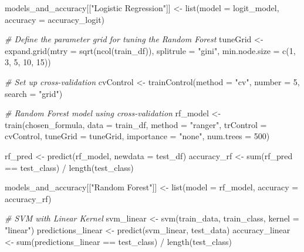 \documentclass[
]{article}
\newenvironment{Shaded}{\begin{snugshade}}{\end{snugshade}}
\newcommand{\AttributeTok}[1]{\textcolor[rgb]{0.77,0.63,0.00}{#1}}
\newcommand{\CommentTok}[1]{\textcolor[rgb]{0.56,0.35,0.01}{\textit{#1}}}
\newcommand{\DecValTok}[1]{\textcolor[rgb]{0.00,0.00,0.81}{#1}}
\newcommand{\FunctionTok}[1]{\textcolor[rgb]{0.00,0.00,0.00}{#1}}
\newcommand{\NormalTok}[1]{#1}
\newcommand{\OtherTok}[1]{\textcolor[rgb]{0.56,0.35,0.01}{#1}}
\newcommand{\SpecialCharTok}[1]{\textcolor[rgb]{0.00,0.00,0.00}{#1}}
\newcommand{\StringTok}[1]{\textcolor[rgb]{0.31,0.60,0.02}{#1}}
\begin{document}
\begin{Shaded}
\begin{Highlighting}[]
\NormalTok{  models\_and\_accuracy[[}\StringTok{"Logistic Regression"}\NormalTok{]] }\OtherTok{\textless{}{-}} \FunctionTok{list}\NormalTok{(}\AttributeTok{model =}\NormalTok{ logit\_model, }\AttributeTok{accuracy =}\NormalTok{ accuracy\_logit)}
  
  \CommentTok{\# Define the parameter grid for tuning the Random Forest}
\NormalTok{  tuneGrid }\OtherTok{\textless{}{-}} \FunctionTok{expand.grid}\NormalTok{(}\AttributeTok{mtry =} \FunctionTok{sqrt}\NormalTok{(}\FunctionTok{ncol}\NormalTok{(train\_df)),}
                        \AttributeTok{splitrule =} \StringTok{"gini"}\NormalTok{,}
                        \AttributeTok{min.node.size =} \FunctionTok{c}\NormalTok{(}\DecValTok{1}\NormalTok{, }\DecValTok{3}\NormalTok{, }\DecValTok{5}\NormalTok{, }\DecValTok{10}\NormalTok{, }\DecValTok{15}\NormalTok{))}

  \CommentTok{\# Set up cross{-}validation}
\NormalTok{  cvControl }\OtherTok{\textless{}{-}} \FunctionTok{trainControl}\NormalTok{(}\AttributeTok{method =} \StringTok{"cv"}\NormalTok{, }\AttributeTok{number =} \DecValTok{5}\NormalTok{, }\AttributeTok{search =} \StringTok{"grid"}\NormalTok{)}

  \CommentTok{\# Random Forest model using cross{-}validation}
\NormalTok{  rf\_model }\OtherTok{\textless{}{-}} \FunctionTok{train}\NormalTok{(chosen\_formula, }\AttributeTok{data =}\NormalTok{ train\_df,}
                  \AttributeTok{method =} \StringTok{"ranger"}\NormalTok{,}
                  \AttributeTok{trControl =}\NormalTok{ cvControl,}
                  \AttributeTok{tuneGrid =}\NormalTok{ tuneGrid,}
                  \AttributeTok{importance =} \StringTok{"none"}\NormalTok{,}
                  \AttributeTok{num.trees =} \DecValTok{500}\NormalTok{)}
  
\NormalTok{  rf\_pred }\OtherTok{\textless{}{-}} \FunctionTok{predict}\NormalTok{(rf\_model, }\AttributeTok{newdata =}\NormalTok{ test\_df)}
\NormalTok{  accuracy\_rf }\OtherTok{\textless{}{-}} \FunctionTok{sum}\NormalTok{(rf\_pred }\SpecialCharTok{==}\NormalTok{ test\_class) }\SpecialCharTok{/} \FunctionTok{length}\NormalTok{(test\_class)}

\NormalTok{  models\_and\_accuracy[[}\StringTok{"Random Forest"}\NormalTok{]] }\OtherTok{\textless{}{-}} \FunctionTok{list}\NormalTok{(}\AttributeTok{model =}\NormalTok{ rf\_model, }\AttributeTok{accuracy =}\NormalTok{ accuracy\_rf)}

  \CommentTok{\# SVM with Linear Kernel}
\NormalTok{  svm\_linear }\OtherTok{\textless{}{-}} \FunctionTok{svm}\NormalTok{(train\_data, train\_class, }\AttributeTok{kernel =} \StringTok{"linear"}\NormalTok{)}
\NormalTok{  predictions\_linear }\OtherTok{\textless{}{-}} \FunctionTok{predict}\NormalTok{(svm\_linear, test\_data)}
\NormalTok{  accuracy\_linear }\OtherTok{\textless{}{-}} \FunctionTok{sum}\NormalTok{(predictions\_linear }\SpecialCharTok{==}\NormalTok{ test\_class) }\SpecialCharTok{/} \FunctionTok{length}\NormalTok{(test\_class)}


\end{Highlighting}
\end{Shaded}
\end{document}
